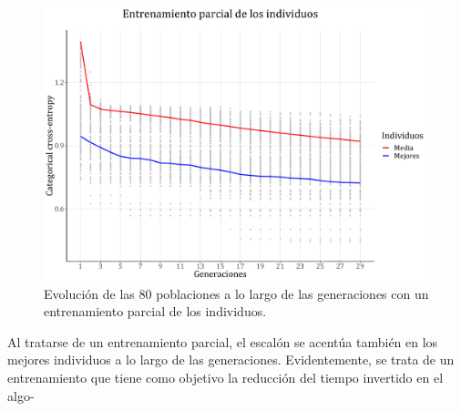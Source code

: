 \documentclass[spanish,a4paper,12pt,twoside]{report}
\begin{document}
  \begin{figure}[H]
    \centering
    \includegraphics[width = 1\textwidth]{resources/Fig19.pdf}
    \caption{Evolución de las 80 poblaciones a lo largo de las generaciones con un entrenamiento parcial de los individuos.}
    \label{fig:19}
  \end{figure} \par
  Al tratarse de un entrenamiento parcial, el escalón se acentúa también en los mejores individuos a lo largo de las generaciones. Evidentemente, se trata de un entrenamiento que tiene como objetivo la reducción del tiempo invertido en el algo-\\
\end{document}
